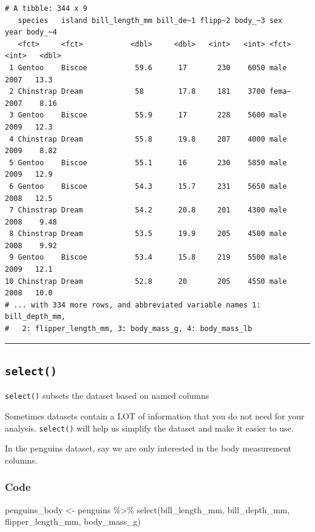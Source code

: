 \documentclass[
  letterpaper,
  DIV=11,
  numbers=noendperiod]{scrreprt}
\newenvironment{Shaded}{\begin{snugshade}}{\end{snugshade}}
\newcommand{\FunctionTok}[1]{\textcolor[rgb]{0.28,0.35,0.67}{#1}}
\newcommand{\NormalTok}[1]{\textcolor[rgb]{0.00,0.23,0.31}{#1}}
\newcommand{\OtherTok}[1]{\textcolor[rgb]{0.00,0.23,0.31}{#1}}
\newcommand{\SpecialCharTok}[1]{\textcolor[rgb]{0.37,0.37,0.37}{#1}}
\begin{document}
\begin{verbatim}
# A tibble: 344 x 9
   species   island bill_length_mm bill_de~1 flipp~2 body_~3 sex    year body_~4
   <fct>     <fct>           <dbl>     <dbl>   <int>   <int> <fct> <int>   <dbl>
 1 Gentoo    Biscoe           59.6      17       230    6050 male   2007   13.3 
 2 Chinstrap Dream            58        17.8     181    3700 fema~  2007    8.16
 3 Gentoo    Biscoe           55.9      17       228    5600 male   2009   12.3 
 4 Chinstrap Dream            55.8      19.8     207    4000 male   2009    8.82
 5 Gentoo    Biscoe           55.1      16       230    5850 male   2009   12.9 
 6 Gentoo    Biscoe           54.3      15.7     231    5650 male   2008   12.5 
 7 Chinstrap Dream            54.2      20.8     201    4300 male   2008    9.48
 8 Chinstrap Dream            53.5      19.9     205    4500 male   2008    9.92
 9 Gentoo    Biscoe           53.4      15.8     219    5500 male   2009   12.1 
10 Chinstrap Dream            52.8      20       205    4550 male   2008   10.0 
# ... with 334 more rows, and abbreviated variable names 1: bill_depth_mm,
#   2: flipper_length_mm, 3: body_mass_g, 4: body_mass_lb
\end{verbatim}

\begin{center}\rule{0.5\linewidth}{0.5pt}\end{center}

\hypertarget{select}{%
\subsection*{\texorpdfstring{\texttt{select()}}{select()}}\label{select}}

\texttt{select()} subsets the dataset based on named columns

Sometimes datasets contain a LOT of information that you do not need for
your analysis. \texttt{select()} will help us simplify the dataset and
make it easier to use.

In the penguins dataset, say we are only interested in the body
measurement columns.

\hypertarget{code-8}{%
\subsubsection*{Code}\label{code-8}}

\begin{Shaded}
\begin{Highlighting}[]
\NormalTok{penguins\_body }\OtherTok{\textless{}{-}}\NormalTok{ penguins }\SpecialCharTok{\%\textgreater{}\%} 
  \FunctionTok{select}\NormalTok{(bill\_length\_mm, bill\_depth\_mm, flipper\_length\_mm, body\_mass\_g)}
\end{Highlighting}
\end{Shaded}
\end{document}
